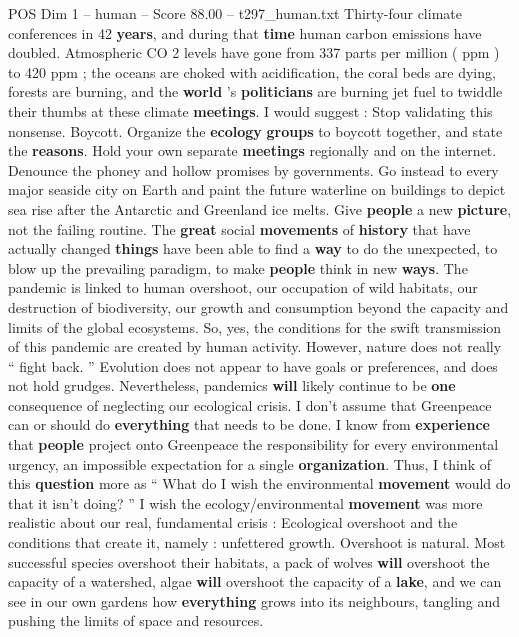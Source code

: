 \begin{textsample}{POS Dim 1 – human – Score 88.00 – t297\_human.txt}
Thirty-four climate conferences in 42 \textbf{years}, and during that \textbf{time} human carbon emissions have doubled.
Atmospheric CO 2 levels have gone from 337 parts per million ( ppm ) to 420 ppm ; the oceans are choked with acidification, the coral beds are dying, forests are burning, and the \textbf{world} ’s \textbf{politicians} are burning jet fuel to twiddle their thumbs at these climate \textbf{meetings}.
I would suggest : Stop validating this nonsense.
Boycott.
Organize the \textbf{ecology} \textbf{groups} to boycott together, and state the \textbf{reasons}.
Hold your own separate \textbf{meetings} regionally and on the internet.
Denounce the phoney and hollow promises by governments.
Go instead to every major seaside city on Earth and paint the future waterline on buildings to depict sea rise after the Antarctic and Greenland ice melts.
Give \textbf{people} a new \textbf{picture}, not the failing routine.
The \textbf{great} social \textbf{movements} of \textbf{history} that have actually changed \textbf{things} have been able to find a \textbf{way} to do the unexpected, to blow up the prevailing paradigm, to make \textbf{people} think in new \textbf{ways}.
The pandemic is linked to human overshoot, our occupation of wild habitats, our destruction of biodiversity, our growth and consumption beyond the capacity and limits of the global ecosystems.
So, yes, the conditions for the swift transmission of this pandemic are created by human activity.
However, nature does not really “ fight back. ” Evolution does not appear to have goals or preferences, and does not hold grudges.
Nevertheless, pandemics \textbf{will} likely continue to be \textbf{one} consequence of neglecting our ecological crisis.
I don't assume that Greenpeace can or should do \textbf{everything} that needs to be done.
I know from \textbf{experience} that \textbf{people} project onto Greenpeace the responsibility for every environmental urgency, an impossible expectation for a single \textbf{organization}.
Thus, I think of this \textbf{question} more as “ What do I wish the environmental \textbf{movement} would do that it isn't doing? ” I wish the ecology/environmental \textbf{movement} was more realistic about our real, fundamental crisis : Ecological overshoot and the conditions that create it, namely : unfettered growth.
Overshoot is natural.
Most successful species overshoot their habitats, a pack of wolves \textbf{will} overshoot the capacity of a watershed, algae \textbf{will} overshoot the capacity of a \textbf{lake}, and we can see in our own gardens how \textbf{everything} grows into its neighbours, tangling and pushing the limits of space and resources.

\end{textsample}
